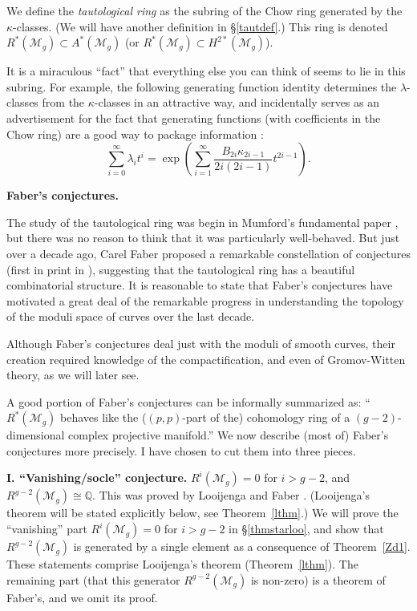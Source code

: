 \documentclass[12pt,letterpaper]{amsart}
\newcommand{\bpoint}[1]{\vspace{3mm}\par \noindent \refstepcounter{subsection}{\bf \thesubsection.} 
  {\bf #1.} }
\newcommand{\Q}{\mathbb{Q}}
\newcommand{\ka}{\kappa}
\newcommand{\cm}{{\mathcal{M}}}
\newcommand{\la}{\lambda}
\newcommand{\lremind}[1]{{\bf[label:  #1]}}
\renewcommand{\lremind}[1]{{}}
\begin{document}
{We define the {\em tautological ring} as the subring of the Chow ring
generated by the
$\ka$-classes.  (We will have another definition in \S \ref{tautdef}.)  This
ring is denoted $R^*(\cm_g)
\subset A^*(\cm_g)$ (or $R^*(\cm_g)
\subset H^{2*}(\cm_g)$).

It is a miraculous ``fact'' that everything else you can think of
seems to lie in this subring.  For example, the following generating
function identity determines the $\la$-classes from the $\ka$-classes
in an attractive way, and incidentally serves as an advertisement
for the fact that generating functions (with coefficients
in the Chow ring) are a good way to package information
\cite[p.~111]{faber}:
$$
\sum_{i=0}^\infty \la_i t^i = \exp \left( \sum_{i=1}^{\infty} 
  \frac { B_{2i} \ka_{2i-1} } {2i (2i-1)} t^{2i-1} \right).$$


\bpoint{Faber's conjectures} 

The study of the tautological ring was
begin in Mumford's fundamental paper \cite{mumford}, but there was no
reason to think that it was particularly well-behaved.  But just over
a decade ago, Carel Faber proposed a remarkable constellation of
conjectures (first in print in \cite{faber}), suggesting that the
tautological ring has a beautiful combinatorial structure.  It is
reasonable to state that Faber's conjectures have motivated a great
deal of the remarkable progress in understanding the topology of the
moduli space of curves over the last
decade.\label{s:fconj}\lremind{s:fconj}

Although Faber's conjectures deal just with the moduli of smooth 
curves, their creation required knowledge of the compactification, and even
of Gromov-Witten theory, as we will later see.

A good portion of Faber's conjectures can be informally summarized
as:  ``$R^*(\cm_g)$ behaves  like the ($(p,p)$-part of
the) cohomology ring of a $(g-2)$-dimensional complex projective manifold.''
We now describe (most of) Faber's conjectures more precisely.
I have chosen to cut them into three pieces.

\noindent
{\bf I. ``Vanishing/socle'' conjecture.}
$R^i(\cm_g) = 0$ for $i>g-2$, and $R^{g-2}(\cm_g) \cong \Q$.  This was
proved by Looijenga \cite{looijenga} and Faber \cite[Thm.~2]{faber}.
(Looijenga's theorem will be stated explicitly below, see
Theorem~\ref{lthm}.)  We will prove the ``vanishing'' part
$R^i(\cm_g)=0$ for $i>g-2$ in \S \ref{thmstarloo}, and show that
$R^{g-2}(\cm_g)$ is generated by a single element as a consequence of
Theorem~\ref{Zd1}.  These statements comprise Looijenga's theorem
(Theorem~\ref{lthm}).  The remaining part (that this generator
$R^{g-2}(\cm_g)$ is non-zero) is a theorem of Faber's, and we omit
its proof.

}
\end{document}
